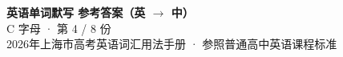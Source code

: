 \documentclass[10pt,a4paper]{article}
\begin{document}
\pagestyle{plain}

\begin{center}
{\LARGE\bfseries 英语单词默写 \quad 参考答案（英 $\to$ 中）}\\[0.22em]
{\large C 字母 · 第 4 / 8 份}\\[0.18em]
{\small 2026年上海市高考英语词汇用法手册 · 参照普通高中英语课程标准}
\end{center}

\vspace{0.2em}
\noindent{\color{rulegray}\rule{\textwidth}{0.8pt}}

\vspace{0.35em}

\vspace{0.25em}
\renewcommand{\arraystretch}{1.32}
\end{document}

